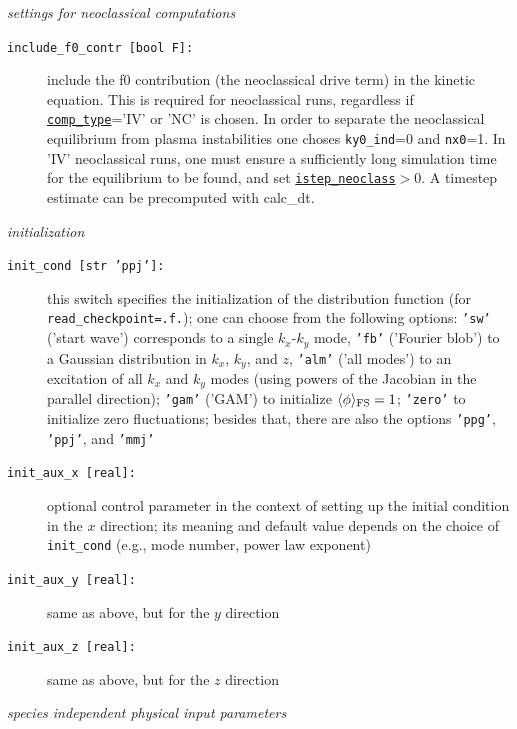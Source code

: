 \documentclass[12pt]{article}
\begin{document}
%
{\em settings for neoclassical computations}
\begin{description}
\item[\hypertarget{include_f0_contr}{\tt include\_f0\_contr [bool F]:}] include the f0 contribution
(the neoclassical drive term) in the kinetic equation. This is required for neoclassical runs, regardless
if \hyperlink{comp_type}{\tt comp\_type}='IV' or 'NC' is chosen. In order to separate the neoclassical equilibrium from plasma instabilities
one choses {\tt ky0\_ind}=0 and {\tt nx0}=1. In 'IV' neoclassical runs, one must ensure a sufficiently long
simulation time for the equilibrium to be found, and set \hyperlink{istep_neoclass}{{\tt istep\_neoclass}$>0$}. A timestep estimate can be precomputed with {calc\_dt}.

\end{description}
%
{\em initialization}
\begin{description}
\item[\hypertarget{init_cond}{\tt init\_cond [str 'ppj']:}] this switch specifies the initialization of the distribution
  function (for \texttt{read\_checkpoint=.f.}); one can choose from the following options:
  \texttt{'sw'} ('start wave') corresponds to a single $k_x$-$k_y$ mode,
  \texttt{'fb'} ('Fourier blob') to a Gaussian distribution in $k_x$, $k_y$, and $z$,
  \texttt{'alm'} ('all modes') to an excitation of all $k_x$ and $k_y$ modes (using powers of the
  Jacobian in the parallel direction); 
  \texttt{'gam'} ('GAM') to initialize $\langle\phi\rangle_{\rm FS} = 1$;
  \texttt{'zero'} to initialize zero fluctuations;
  besides that, there are also the options \texttt{'ppg'},
  \texttt{'ppj'}, and \texttt{'mmj'}
\item[\texttt{init\_aux\_x [real]:}] optional control parameter in the context of setting up the initial
  condition in the $x$ direction; its meaning and default value depends on the choice of \texttt{init\_cond}
  (e.g., mode number, power law exponent)
\item[\texttt{init\_aux\_y [real]:}] same as above, but for the $y$ direction
\item[\texttt{init\_aux\_z [real]:}] same as above, but for the $z$ direction
\end{description}
%
{\em species independent physical input parameters}
\end{document}
